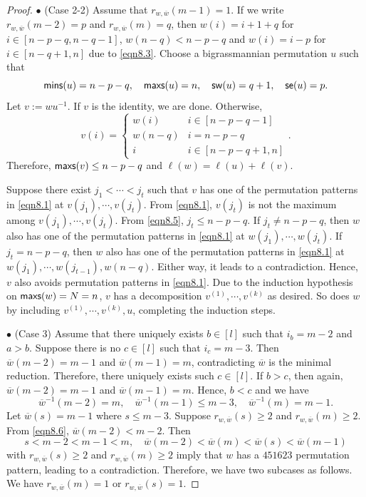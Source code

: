 \documentclass[12pt]{amsart}
\theoremstyle{definition}
\theoremstyle{remark}
\begin{document}
\begin{proof}
$\bullet$ (Case 2-2) Assume that $r_{w , \overline{w}} (m-1) = 1$. If we write $r_{w , \overline{w}} (m-2) = p$ and $r_{w , \overline{w}} (m) = q$, then $w(i) = i+1+q$ for $i \in [n-p-q , n-q-1]$, $w(n-q) <n-p-q$ and $w(i) = i-p$ for $i \in [n-q+1 , n]$ due to \eqref{eqn8.3}. Choose a bigrassmannian permutation $u$ such that
\begin{equation}
{\sf mins}(u) = n-p-q , \quad {\sf maxs}(u) = n , \quad {\sf sw}(u) = q+1, \quad {\sf se}(u) = p.
\end{equation}
Let $v:= wu^{-1}$. If $v$ is the identity, we are done. Otherwise,
\begin{equation}\label{eqn8.5}
v (i) = 
\begin{cases}
w(i) & i \in [n-p-q-1] \\
w(n-q) & i = n-p -q \\
i & i \in [n-p-q+1 , n]
\end{cases}
.
\end{equation}
Therefore, ${\sf maxs} (v) \leq n-p-q$ and $\ell (w) = \ell (u) + \ell (v)$. 

Suppose there exist $j_1 < \cdots < j_t$ such that $v$ has one of the permutation patterns in \eqref{eqn8.1} at $v(j_1) , \cdots , v(j_t)$. From \eqref{eqn8.1}, $v(j_t)$ is not the maximum among $v(j_1) , \cdots , v(j_t)$. From \eqref{eqn8.5}, $j_t \leq n-p-q$. If $j_t \neq n-p-q$, then $w$ also has one of the permutation patterns in \eqref{eqn8.1} at $w(j_1) , \cdots , w(j_t)$. If $j_t = n-p-q$, then $w$ also has one of the permutation patterns in \eqref{eqn8.1} at $w(j_1) , \cdots , w(j_{t-1}), w(n-q)$. Either way, it leads to a contradiction. Hence, $v$ also avoids permutation patterns in \eqref{eqn8.1}. Due to the induction hypothesis on ${\sf maxs}(w) = N = n$, $v$ has a decomposition $v^{(1)} , \cdots , v^{(k)}$ as desired. So does $w$ by including $v^{(1)} , \cdots , v^{(k)} , u$, completing the induction steps.

$\bullet$ (Case 3) Assume that there uniquely exists $b \in [l]$ such that $i_b = m-2$ and $a > b$. Suppose there is no $c \in [l]$ such that $i_c = m-3$. Then $\overline{w} (m-2)= m-1$ and $\overline{w} (m-1) = m$, contradicting $\overline{w}$ is the minimal reduction. Therefore, there uniquely exists such $c \in [l]$. If $b > c$, then again, $\overline{w} (m-2)= m-1$ and $\overline{w} (m-1) = m$. Hence, $b <c$ and we have
\begin{equation}\label{eqn8.6}
\overline{w}^{-1}(m-2) = m , \quad \overline{w}^{-1} (m-1 ) \leq m-3 , \quad \overline{w}^{-1} (m) = m-1.
\end{equation}
Let $\overline{w} (s) = m-1$ where $s \leq m-3$. Suppose $r_{w , \overline{w}} (s) \geq 2$ and $r_{w , \overline{w}} (m) \geq 2$. From \eqref{eqn8.6}, $\overline{w} (m-2) < m-2$. Then
\begin{equation}
s < m-2 < m-1 < m, \quad \overline{w} (m-2) < \overline{w} (m) < \overline{w} (s) < \overline{w} (m-1)
\end{equation}
with $r_{w , \overline{w}} (s) \geq 2$ and $r_{w , \overline{w}} (m) \geq 2$ imply that $w$ has a $451623$ permutation pattern, leading to a contradiction. Therefore, we have two subcases as follows. We have $r_{w , \overline{w}} (m) = 1$ or $r_{w , \overline{w}} (s) = 1$.


\end{proof}
\end{document}
